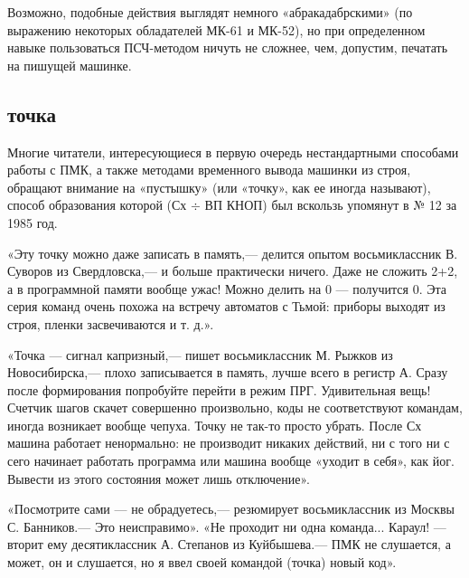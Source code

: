 \documentclass[11pt,a4paper,oneside]{article}
\begin{document}
Возможно, подобные действия выглядят немного «абракадабрскими» (по выражению некоторых обладателей МК-61 и МК-52), но при определенном навыке пользоваться ПСЧ-методом ничуть не сложнее, чем, допустим, печатать на пишущей машинке.

\subsection{точка}
Многие читатели, интересующиеся в первую очередь нестандартными способами работы с ПМК, а также методами временного вывода машинки из строя, обращают внимание на «пустышку» (или «точку», как ее иногда называют), способ образования которой (Сх $\div$ ВП КНОП) был вскользь упомянут в № 12 за 1985 год.

«Эту точку можно даже записать в память,— делится опытом восьмиклассник В. Суворов из Свердловска,— и больше практически ничего. Даже не сложить 2+2, а в программной памяти вообще ужас! Можно делить на 0 — получится 0. Эта серия команд очень похожа на встречу автоматов с Тьмой: приборы выходят из строя, пленки засвечиваются и т. д.».

«Точка — сигнал капризный,— пишет восьмиклассник М. Рыжков из Новосибирска,— плохо записывается в память, лучше всего в регистр А. Сразу после формирования попробуйте перейти в режим ПРГ. Удивительная вещь! Счетчик шагов скачет совершенно произвольно, коды не соответствуют командам, иногда возникает вообще чепуха. Точку не так-то просто убрать. После Сх машина работает ненормально: не производит никаких действий, ни с того ни с сего начинает работать программа или машина вообще «уходит в себя», как йог. Вывести из этого состояния может лишь отключение».

«Посмотрите сами — не обрадуетесь,— резюмирует восьмиклассник из Москвы С. Банников.— Это неисправимо». «Не проходит ни одна команда... Караул! — вторит ему десятиклассник А. Степанов из Куйбышева.— ПМК не слушается, а может, он и слушается, но я ввел своей командой (точка) новый код».
\end{document}

